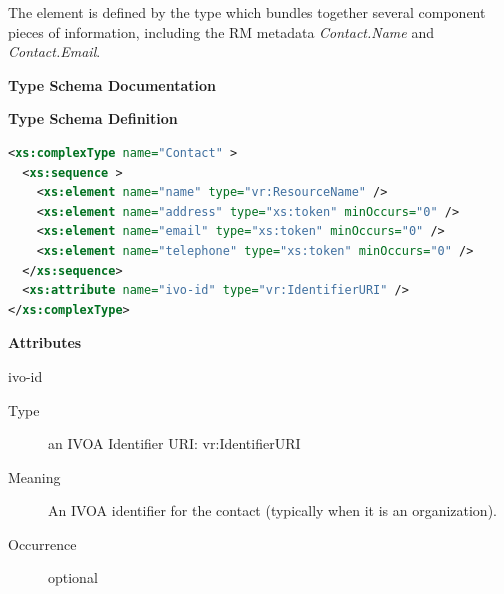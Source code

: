 \documentclass[11pt,a4paper]{ivoa}
\begin{document}



The  element is defined by the
 type which bundles together several component
pieces of information, including the RM metadata \emph{Contact.Name}
and \emph{Contact.Email}.  



\begin{generated}
\begingroup
      	\renewcommand*\descriptionlabel[1]{%
      	\hbox to 5.5em{\emph{#1}\hfil}}\vspace{2ex}\noindent\textbf{ Type Schema Documentation}


\vspace{1ex}\noindent\textbf{ Type Schema Definition}

\begin{lstlisting}[language=XML,basicstyle=\footnotesize]
<xs:complexType name="Contact" >
  <xs:sequence >
    <xs:element name="name" type="vr:ResourceName" />
    <xs:element name="address" type="xs:token" minOccurs="0" />
    <xs:element name="email" type="xs:token" minOccurs="0" />
    <xs:element name="telephone" type="xs:token" minOccurs="0" />
  </xs:sequence>
  <xs:attribute name="ivo-id" type="vr:IdentifierURI" />
</xs:complexType>
\end{lstlisting}

\vspace{0.5ex}\noindent\textbf{ Attributes}

\begingroup\small\begin{bigdescription}
\item[ivo-id]
\begin{description}
\item[Type] an IVOA Identifier URI: vr:IdentifierURI
\item[Meaning] 
             An IVOA identifier for the contact (typically when it is
             an organization).
           
\item[Occurrence] optional

\end{description}


\end{bigdescription}\endgroup




\end{generated}
\end{document}
